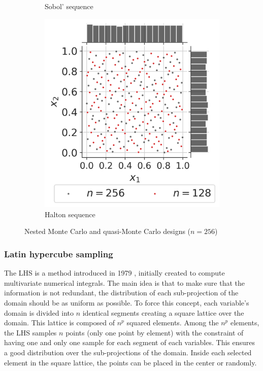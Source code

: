 \begin{figure}[ht]
\begin{subfigure}[b]{0.32\textwidth}
        \caption{Sobol' sequence}
    \end{subfigure}
    \hfill
    \begin{subfigure}[b]{0.32\textwidth}
        \centering
        \includegraphics[width=\textwidth]{../numerical_experiments/chapter1/figures/quasi_MonteCarlo_Halton_256.png}
        \caption{Halton sequence}
    \end{subfigure}
       \caption{Nested Monte Carlo and quasi-Monte Carlo designs ($n=256$)}
       \label{fig:quasi_monte_carlo_designs}
\end{figure}

\subsubsection{Latin hypercube sampling}
The LHS is a method introduced in 1979 \citep{mckay_beckman_1979}, initially created to compute multivariate numerical integrals. 
The main idea is that to make sure that the information is not redundant, the distribution of each sub-projection of the domain should be as uniform as possible. 
To force this concept, each variable's domain is divided into $n$ identical segments creating a square lattice over the domain. 
This lattice is composed of $n^{p}$ squared elements. 
Among the $n^{p}$ elements, the LHS samples $n$ points (only one point by element) with the constraint of having one and only one sample for each segment of each variables. 
This ensures a good distribution over the sub-projections of the domain. 
Inside each selected element in the square lattice, the points can be placed in the center or randomly.

